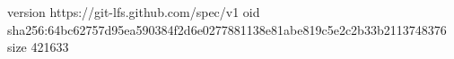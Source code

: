 version https://git-lfs.github.com/spec/v1
oid sha256:64bc62757d95ea590384f2d6e0277881138e81abe819c5e2c2b33b2113748376
size 421633
